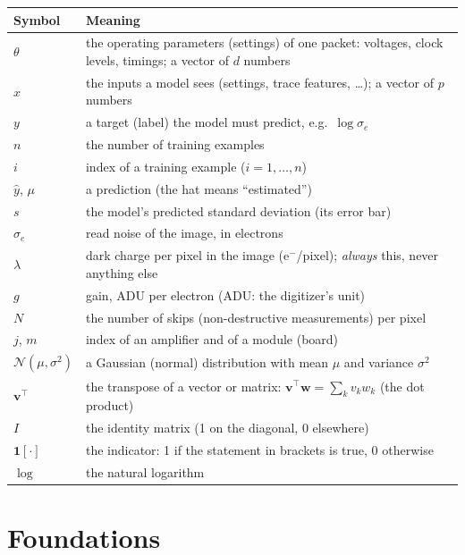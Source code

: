 \documentclass[11pt]{article}
\newcommand{\N}{\mathcal{N}}
\newcommand{\ind}{\mathbf{1}}
\begin{document}
\begin{center}\small
\begin{tabularx}{\textwidth}{>{\raggedright\arraybackslash}p{3.0cm}X}
\toprule
Symbol & Meaning \\
\midrule
$\theta$ & the operating parameters (settings) of one packet: voltages, clock levels, timings; a vector of $d$ numbers \\
$x$ & the inputs a model sees (settings, trace features, \dots); a vector of $p$ numbers \\
$y$ & a target (label) the model must predict, e.g.\ $\log\sigma_e$ \\
$n$ & the number of training examples \\
$i$ & index of a training example ($i = 1, \dots, n$) \\
$\hat y$, $\mu$ & a prediction (the hat means ``estimated'') \\
$s$ & the model's predicted standard deviation (its error bar) \\
$\sigma_e$ & read noise of the image, in electrons \\
$\lambda$ & dark charge per pixel in the image (e$^-$/pixel); \emph{always} this, never anything else \\
$g$ & gain, ADU per electron (ADU: the digitizer's unit) \\
$N$ & the number of skips (non-destructive measurements) per pixel \\
$j$, $m$ & index of an amplifier and of a module (board) \\
$\N(\mu, \sigma^2)$ & a Gaussian (normal) distribution with mean $\mu$ and variance $\sigma^2$ \\
$\bm{v}^\top$ & the transpose of a vector or matrix: $\bm{v}^\top \bm{w} = \sum_k v_k w_k$ (the dot product) \\
$I$ & the identity matrix (1 on the diagonal, 0 elsewhere) \\
$\ind[\cdot]$ & the indicator: 1 if the statement in brackets is true, 0 otherwise \\
$\log$ & the natural logarithm \\
\bottomrule
\end{tabularx}
\end{center}

\part{Foundations}
\end{document}
